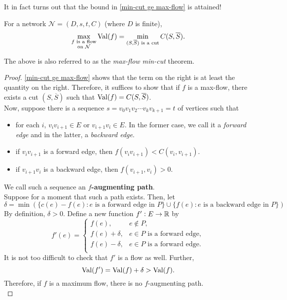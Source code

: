 			It in fact turns out that the bound in \eqref{min-cut ge max-flow} is attained!

			\begin{ftheo}
				For a network $\mathcal{N} = (D,s,t,C)$ (where $D$ is finite),
				\[ \max_{\substack{f\text{ is a flow} \\ \text{on }\mathcal{N}}} \operatorname{Val}(f) = \min_{(S,\overline{S}) \text{ is a cut}} C(S,\overline{S}). \]
			\end{ftheo}
			The above is also referred to as the \emph{max-flow min-cut} theorem.
			\begin{proof}
				\eqref{min-cut ge max-flow} shows that the term on the right is at least the quantity on the right. Therefore, it suffices to show that if $f$ is a max-flow, there exists a cut $(S,\overline{S})$ such that $\operatorname{Val}(f) = C(S,\overline{S})$.\\
				Now, suppose there is a sequence $s = v_0 v_1 v_2 \cdots v_k v_{k+1} = t$ of vertices such that
				\begin{itemize}
					\item for each $i$, $v_i v_{i+1} \in E$ or $v_{i+1} v_i \in E$. In the former case, we call it a \emph{forward edge} and in the latter, a \emph{backward edge}.
					\item if $v_i v_{i+1}$ is a forward edge, then $f(v_iv_{i+1}) < C(v_i, v_{i+1})$.
					\item if $v_{i+1} v_i$ is a backward edge, then $f(v_{i+1},v_i) > 0$.
				\end{itemize}
				We call such a sequence an \textbf{$f$-augmenting path}.\\
				Suppose for a moment that such a path exists. Then, let
				\[ \delta = \min \left(\{ c(e) - f(e) : e \text{ is a forward edge in $P$} \} \cup \{ f(e) : e \text{ is a backward edge in $P$} \}\right) \]
				By definition, $\delta > 0$. Define a new function $f' : E \to \mathbb{R}$ by
				\[
					f'(e) =
					\begin{cases}
						f(e), & e \not\in P, \\
						f(e) + \delta, & e \in P\text{ is a forward edge}, \\
						f(e) - \delta, & e \in P\text{ is a forward edge}. \\
					\end{cases}
				\]
				It is not too difficult to check that $f'$ is a flow as well. Further,
				\[ \operatorname{Val}(f') = \operatorname{Val}(f) + \delta > \operatorname{Val}(f). \]
				Therefore, if $f$ is a maximum flow, there is no $f$-augmenting path.\\

\end{proof}
